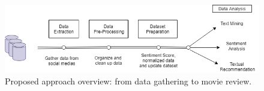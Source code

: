 \begin{figure}[htb]
\begin{center}
\includegraphics[width=0.8\linewidth]{img/model.png}
\end{center}
   \caption{Proposed approach overview: from data gathering to movie review.}
\label{fig:approach}
\end{figure}




